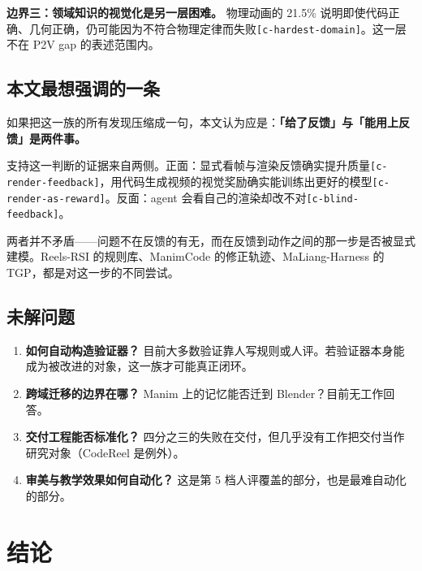 \textbf{边界三：领域知识的视觉化是另一层困难。} 物理动画的 21.5\% 说明即使代码正确、几何正确，仍可能因为不符合物理定律而失败{\scriptsize\texttt{[c-\hspace{0pt}hardest-\hspace{0pt}domain]}}。这一层不在 P2V gap 的表述范围内。


\subsection{本文最想强调的一条}

如果把这一族的所有发现压缩成一句，本文认为应是：\textbf{「给了反馈」与「能用上反馈」是两件事。}


支持这一判断的证据来自两侧。正面：显式看帧与渲染反馈确实提升质量{\scriptsize\texttt{[c-\hspace{0pt}render-\hspace{0pt}feedback]}}，用代码生成视频的视觉奖励确实能训练出更好的模型{\scriptsize\texttt{[c-\hspace{0pt}render-\hspace{0pt}as-\hspace{0pt}reward]}}。反面：agent 会看自己的渲染却改不对{\scriptsize\texttt{[c-\hspace{0pt}blind-\hspace{0pt}feedback]}}。


两者并不矛盾——问题不在反馈的有无，而在反馈到动作之间的那一步是否被显式建模。Reels-RSI 的规则库、ManimCode 的修正轨迹、MaLiang-Harness 的 TGP，都是对这一步的不同尝试。


\subsection{未解问题}

\begin{enumerate}
  \item \textbf{如何自动构造验证器？} 目前大多数验证靠人写规则或人评。若验证器本身能成为被改进的对象，这一族才可能真正闭环。
  \item \textbf{跨域迁移的边界在哪？} Manim 上的记忆能否迁到 Blender？目前无工作回答。
  \item \textbf{交付工程能否标准化？} 四分之三的失败在交付，但几乎没有工作把交付当作研究对象（CodeReel 是例外）。
  \item \textbf{审美与教学效果如何自动化？} 这是第 5 档人评覆盖的部分，也是最难自动化的部分。
\end{enumerate}


\section{结论}

